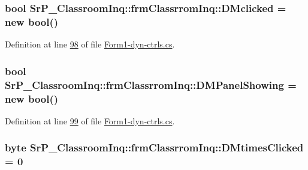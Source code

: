 \hypertarget{class_sr_p___classroom_inq_1_1frm_classrrom_inq_a663c3385393ae39a41bd647632ba4617}{
\subsubsection[{\-D\-Mclicked}]{\setlength{\rightskip}{0pt plus 5cm}bool {\bf \-Sr\-P\-\_\-\-Classroom\-Inq\-::frm\-Classrrom\-Inq\-::\-D\-Mclicked} = new bool()}}
\label{class_sr_p___classroom_inq_1_1frm_classrrom_inq_a663c3385393ae39a41bd647632ba4617}


\-Definition at line \hyperlink{_form1-dyn-ctrls_8cs_source_l00098}{98} of file \hyperlink{_form1-dyn-ctrls_8cs_source}{\-Form1-\/dyn-\/ctrls.\-cs}.

\hypertarget{class_sr_p___classroom_inq_1_1frm_classrrom_inq_a7a4d3ad70d4284ad3f7d8ab3ca8718e0}{
\subsubsection[{\-D\-M\-Panel\-Showing}]{\setlength{\rightskip}{0pt plus 5cm}bool {\bf \-Sr\-P\-\_\-\-Classroom\-Inq\-::frm\-Classrrom\-Inq\-::\-D\-M\-Panel\-Showing} = new bool()}}
\label{class_sr_p___classroom_inq_1_1frm_classrrom_inq_a7a4d3ad70d4284ad3f7d8ab3ca8718e0}


\-Definition at line \hyperlink{_form1-dyn-ctrls_8cs_source_l00099}{99} of file \hyperlink{_form1-dyn-ctrls_8cs_source}{\-Form1-\/dyn-\/ctrls.\-cs}.

\hypertarget{class_sr_p___classroom_inq_1_1frm_classrrom_inq_a595a5c6942aa919d47de2b3e20f5f5bc}{
\subsubsection[{\-D\-Mtimes\-Clicked}]{\setlength{\rightskip}{0pt plus 5cm}byte {\bf \-Sr\-P\-\_\-\-Classroom\-Inq\-::frm\-Classrrom\-Inq\-::\-D\-Mtimes\-Clicked} = 0}}
\label{class_sr_p___classroom_inq_1_1frm_classrrom_inq_a595a5c6942aa919d47de2b3e20f5f5bc}


